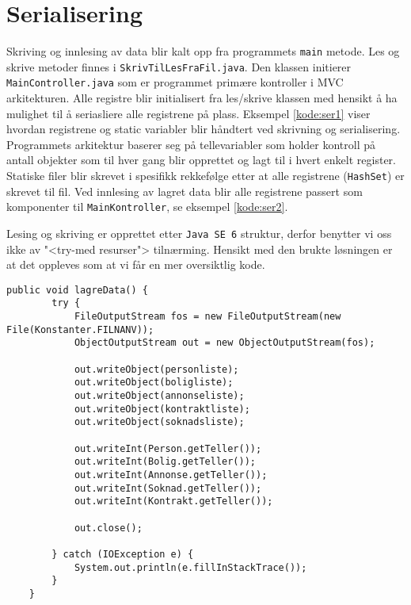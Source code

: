 \section{Serialisering} \label{sec:serialisering}
Skriving og innlesing av data blir kalt opp fra programmets \texttt{main} metode. Les og skrive metoder finnes i \texttt{SkrivTilLesFraFil.java}. Den klassen initierer \texttt{MainController.java} som er programmet primære kontroller i MVC arkitekturen. Alle registre blir initialisert fra les/skrive klassen med hensikt å ha mulighet til å seriasliere alle registrene på plass. 
Eksempel \ref{kode:ser1} viser hvordan registrene og static variabler blir håndtert ved skrivning og serialisering. 
Programmets arkitektur baserer seg på tellevariabler som holder kontroll på antall objekter som til hver gang blir opprettet og lagt til i hvert enkelt register. Statiske filer blir skrevet i spesifikk rekkefølge etter at alle registrene (\texttt{HashSet}) er skrevet til fil.
Ved innlesing av lagret data blir alle registrene passert som komponenter til \texttt{MainKontroller}, se eksempel \ref{kode:ser2}. 

Lesing og skriving er opprettet etter \texttt{Java SE 6} struktur, derfor benytter vi oss ikke av  "<try-med resurser"> tilnærming. Hensikt med den brukte løsningen er at det oppleves som at vi får en mer oversiktlig kode.


\begin{lstlisting}[caption=Serialisering og skriving av data.,label=kode:ser1]
    public void lagreData() {
        try {
            FileOutputStream fos = new FileOutputStream(new File(Konstanter.FILNANV));
            ObjectOutputStream out = new ObjectOutputStream(fos);

            out.writeObject(personliste);
            out.writeObject(boligliste);
            out.writeObject(annonseliste);
            out.writeObject(kontraktliste);
            out.writeObject(soknadsliste);

            out.writeInt(Person.getTeller());
            out.writeInt(Bolig.getTeller());
            out.writeInt(Annonse.getTeller());
            out.writeInt(Soknad.getTeller());
            out.writeInt(Kontrakt.getTeller());

            out.close();

        } catch (IOException e) {
            System.out.println(e.fillInStackTrace());
        }
    }
\end{lstlisting}

